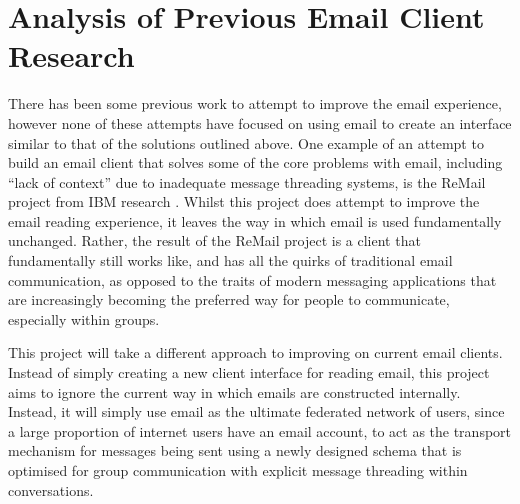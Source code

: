 \section{Analysis of Previous Email Client Research}

There has been some previous work to attempt to improve the email experience, however none of these attempts have focused on using email to create an interface similar to that of the solutions outlined above. One example of an attempt to build an email client that solves some of the core problems with email, including ``lack of context'' due to inadequate message threading systems, is the ReMail project from IBM research \cite{kerr2004designing}. Whilst this project does attempt to improve the email reading experience, it leaves the way in which email is used fundamentally unchanged. Rather, the result of the ReMail project is a client that fundamentally still works like, and has all the quirks of traditional email communication, as opposed to the traits of modern messaging applications that are increasingly becoming the preferred way for people to communicate, especially within groups.

This project will take a different approach to improving on current email clients. Instead of simply creating a new client interface for reading email, this project aims to ignore the current way in which emails are constructed internally. Instead, it will simply use email as the ultimate federated network of users, since a large proportion of internet users have an email account, to act as the transport mechanism for messages being sent using a newly designed schema that is optimised for group communication with explicit message threading within conversations.
